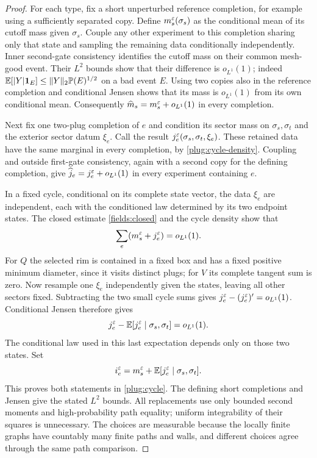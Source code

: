 \begin{proof}
For each type, fix a short unperturbed reference completion, for example
using a sufficiently separated copy.  Define $m_s^\varepsilon(\sigma_s)$ as
the conditional mean of its cutoff mass given $\sigma_s$.  Couple any
other experiment to this completion sharing only that state and sampling
the remaining data conditionally independently.  Inner second-gate
consistency identifies the cutoff mass on their common mesh-good event.
Their $L^2$ bounds show that their difference is $o_{L^1}(1)$; indeed
$\mathbb E[|Y|\mathbf 1_E]\le\|Y\|_2\mathbb P(E)^{1/2}$ on a bad event $E$.
Using two copies also in the reference completion and conditional Jensen
shows that its mass is $o_{L^1}(1)$ from its own conditional mean.
Consequently $\widehat m_s=m_s^\varepsilon+o_{L^1}(1)$ in every completion.

Next fix one two-plug completion of $e$ and condition its sector mass on
$\sigma_s,\sigma_t$ and the exterior sector datum $\xi_e$.  Call the
result $j_e^\varepsilon(\sigma_s,\sigma_t,\xi_e)$.  These retained data have
the same marginal in every completion, by \eqref{plug:cycle-density}.
Coupling and outside first-gate consistency, again with a second copy
for the defining completion, give
$\widehat j_e=j_e^\varepsilon+o_{L^1}(1)$ in every experiment containing $e$.

In a fixed cycle, conditional on its complete state vector, the data
$\xi_e$ are independent, each with the conditioned law determined by its
two endpoint states.  The closed estimate \eqref{fields:closed} and the
cycle density show that
\[
 \sum_e(m_s^\varepsilon+j_e^\varepsilon)=o_{L^1}(1).
\]
For $Q$ the selected rim is contained in a fixed box and has a fixed
positive minimum diameter, since it visits distinct plugs; for $V$ its
complete tangent sum is zero.  Now resample one $\xi_e$ independently
given the states, leaving all other sectors fixed.  Subtracting the two
small cycle sums gives $j_e^\varepsilon-(j_e^\varepsilon)'=o_{L^1}(1)$.  Conditional
Jensen therefore gives
\[
 j_e^\varepsilon-
 \mathbb E[j_e^\varepsilon\mid\sigma_s,\sigma_t]=o_{L^1}(1).
\]
The conditional law used in this last expectation depends only on those
two states.  Set
\[
 i_e^\varepsilon=m_s^\varepsilon+
         \mathbb E[j_e^\varepsilon\mid\sigma_s,\sigma_t].
\]
This proves both statements in \eqref{plug:cycle}.  The defining short
completions and Jensen give the stated $L^2$ bounds.  All replacements
use only bounded second moments and high-probability path equality;
uniform integrability of their squares is unnecessary.  The choices
are measurable because the locally finite graphs have countably many
finite paths and walls, and different choices agree through the same
path comparison.
\end{proof}

